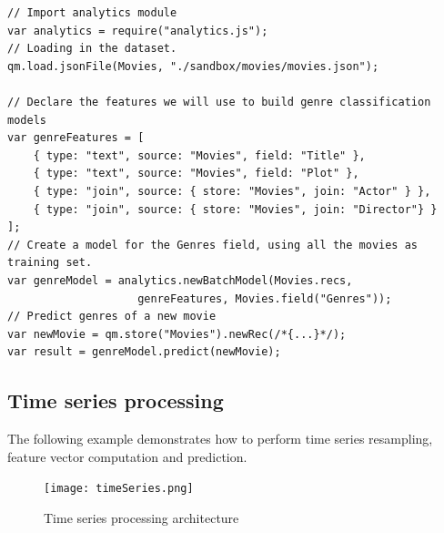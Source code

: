 \documentclass{article} %
\begin{document}
\begin{lstlisting}[caption={Text mining: storage, feature extraction, classification and regression}] 	
// Import analytics module
var analytics = require("analytics.js");
// Loading in the dataset.
qm.load.jsonFile(Movies, "./sandbox/movies/movies.json");
 	
// Declare the features we will use to build genre classification models
var genreFeatures = [
    { type: "text", source: "Movies", field: "Title" },
    { type: "text", source: "Movies", field: "Plot" },
    { type: "join", source: { store: "Movies", join: "Actor" } },
    { type: "join", source: { store: "Movies", join: "Director"} }
];
// Create a model for the Genres field, using all the movies as training set.
var genreModel = analytics.newBatchModel(Movies.recs,
                    genreFeatures, Movies.field("Genres"));
// Predict genres of a new movie
var newMovie = qm.store("Movies").newRec(/*{...}*/);
var result = genreModel.predict(newMovie);
\end{lstlisting}



\subsection{Time series processing}
The following example demonstrates how to perform time series resampling, feature vector computation and prediction.

\begin{figure}[h]
\begin{center}
\texttt{[image: timeSeries.png]}
\end{center}
\caption{Time series processing architecture}
\end{figure}
\end{document}
